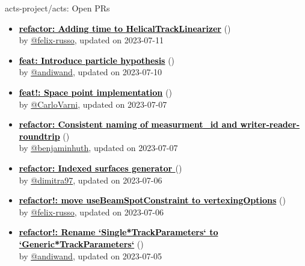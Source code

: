 \begin{frame}[allowframebreaks]{ acts-project/acts: Open PRs
}
\begin{itemize}
    \item\iss\textbf{\href{https://github.com/acts-project/acts/pull/2179}{\textcolor{black}{refactor: Adding time to HelicalTrackLinearizer}}}
    (\href{https://github.com/acts-project/acts/pull/2179}{}) \\
    by \href{https://github.com/felix-russo}{@felix-russo}, updated on 2023-07-11

    \item\iss\textbf{\href{https://github.com/acts-project/acts/pull/2254}{\textcolor{black}{feat: Introduce particle hypothesis}}}
    (\href{https://github.com/acts-project/acts/pull/2254}{}) \\
    by \href{https://github.com/andiwand}{@andiwand}, updated on 2023-07-10

    \item\iss\textbf{\href{https://github.com/acts-project/acts/pull/1900}{\textcolor{black}{feat!: Space point implementation}}}
    (\href{https://github.com/acts-project/acts/pull/1900}{}) \\
    by \href{https://github.com/CarloVarni}{@CarloVarni}, updated on 2023-07-07

    \item\iss\textbf{\href{https://github.com/acts-project/acts/pull/2103}{\textcolor{black}{refactor: Consistent naming of measurment\_id and writer-reader-roundtrip}}}
    (\href{https://github.com/acts-project/acts/pull/2103}{}) \\
    by \href{https://github.com/benjaminhuth}{@benjaminhuth}, updated on 2023-07-07

    \item\iss\textbf{\href{https://github.com/acts-project/acts/pull/2234}{\textcolor{black}{refactor: Indexed surfaces generator }}}
    (\href{https://github.com/acts-project/acts/pull/2234}{}) \\
    by \href{https://github.com/dimitra97}{@dimitra97}, updated on 2023-07-06

    \item\iss\textbf{\href{https://github.com/acts-project/acts/pull/2272}{\textcolor{black}{refactor!: move useBeamSpotConstraint to vertexingOptions}}}
    (\href{https://github.com/acts-project/acts/pull/2272}{}) \\
    by \href{https://github.com/felix-russo}{@felix-russo}, updated on 2023-07-06

    \item\iss\textbf{\href{https://github.com/acts-project/acts/pull/2269}{\textcolor{black}{refactor!: Rename `Single*TrackParameters` to `Generic*TrackParameters`}}}
    (\href{https://github.com/acts-project/acts/pull/2269}{}) \\
    by \href{https://github.com/andiwand}{@andiwand}, updated on 2023-07-05


\end{itemize}
\end{frame}
